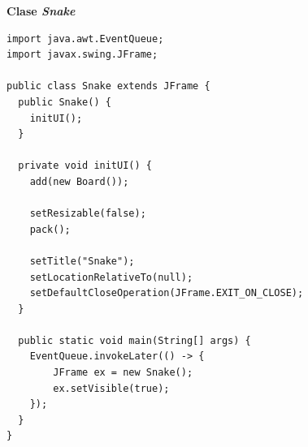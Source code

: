 \documentclass[11pt, twocolumn]{article}
\begin{document}
  \textbf{Clase \textit{Snake}}
  \begin{lstlisting}
import java.awt.EventQueue;
import javax.swing.JFrame;

public class Snake extends JFrame {
  public Snake() {
    initUI();
  }

  private void initUI() {
    add(new Board());

    setResizable(false);
    pack();

    setTitle("Snake");
    setLocationRelativeTo(null);
    setDefaultCloseOperation(JFrame.EXIT_ON_CLOSE);
  }

  public static void main(String[] args) {
    EventQueue.invokeLater(() -> {
        JFrame ex = new Snake();
        ex.setVisible(true);
    });
  }
}
  \end{lstlisting}
\end{document}
